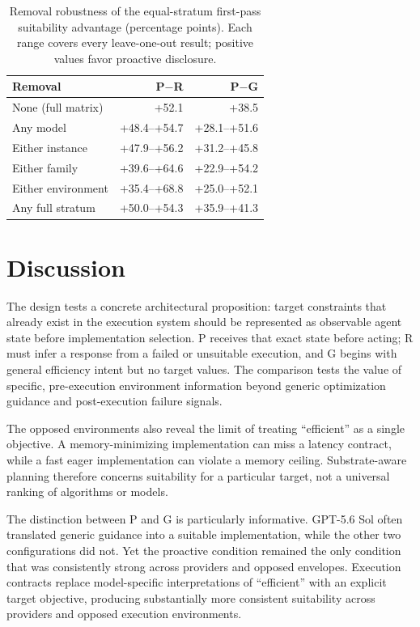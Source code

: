 \documentclass[sigconf,anonymous]{aamas}
\begin{document}
\begin{table}[H]
  \caption{Removal robustness of the equal-stratum first-pass suitability
  advantage (percentage points). Each range covers every leave-one-out result;
  positive values favor proactive disclosure.}
  \label{tab:removal}
  \centering
  \small
  \begin{tabular}{lrr}
    \toprule
    Removal & P$-$R & P$-$G \\
    \midrule
    None (full matrix) & +52.1 & +38.5 \\
    Any model & +48.4--+54.7 & +28.1--+51.6 \\
    Either instance & +47.9--+56.2 & +31.2--+45.8 \\
    Either family & +39.6--+64.6 & +22.9--+54.2 \\
    Either environment & +35.4--+68.8 & +25.0--+52.1 \\
    Any full stratum & +50.0--+54.3 & +35.9--+41.3 \\
    \bottomrule
  \end{tabular}
\end{table}

\section{Discussion}

The design tests a concrete architectural proposition: target constraints that
already exist in the execution system should be represented as observable agent
state before implementation selection. P receives that exact state before acting;
R must infer a response from a failed or unsuitable execution, and G begins with
general efficiency intent but no target values. The comparison tests the value of
specific, pre-execution environment information beyond generic optimization
guidance and post-execution failure signals.

The opposed environments also reveal the limit of treating ``efficient'' as a
single objective. A memory-minimizing implementation can miss a latency contract,
while a fast eager implementation can violate a memory ceiling. Substrate-aware
planning therefore concerns suitability for a particular target, not a universal
ranking of algorithms or models.

The distinction between P and G is particularly informative. GPT-5.6 Sol often
translated generic guidance into a suitable implementation, while the other two
configurations did not. Yet the proactive condition remained the only condition
that was consistently strong across providers and opposed envelopes. Execution
contracts replace model-specific interpretations of ``efficient'' with an
explicit target objective, producing substantially more consistent suitability
across providers and opposed execution environments.
\end{document}

